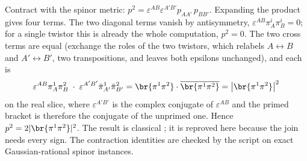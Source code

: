 Contract with the spinor metric: $p^{2} = \varepsilon^{AB}\varepsilon^{A'B'} p_{AA'}\, p_{BB'}$. Expanding the product gives four terms. The two diagonal terms vanish by antisymmetry, $\varepsilon^{AB}\pi^{i}_{A}\pi^{i}_{B} = 0$; for a single twistor this is already the whole computation, $p^{2} = 0$. The two cross terms are equal (exchange the roles of the two twistors, which relabels $A \leftrightarrow B$ and $A' \leftrightarrow B'$, two transpositions, and leaves both epsilons unchanged), and each is
\[
\varepsilon^{AB}\pi^{1}_{A}\pi^{2}_{B}\;\cdot\;\varepsilon^{A'B'}\bar\pi^{1}_{A'}\bar\pi^{2}_{B'}
= \br{\pi^{1}\pi^{2}}\cdot\overline{\br{\pi^{1}\pi^{2}}}
= \bigl|\br{\pi^{1}\pi^{2}}\bigr|^{2}
\]
on the real slice, where $\varepsilon^{A'B'}$ is the complex conjugate of $\varepsilon^{AB}$ and the primed bracket is therefore the conjugate of the unprimed one. Hence $p^{2} = 2|\br{\pi^{1}\pi^{2}}|^{2}$. The result is classical \cite{Hughston1979}; it is reproved here because the join needs every sign. The contraction identities are checked by the script on exact Gaussian-rational spinor instances.

